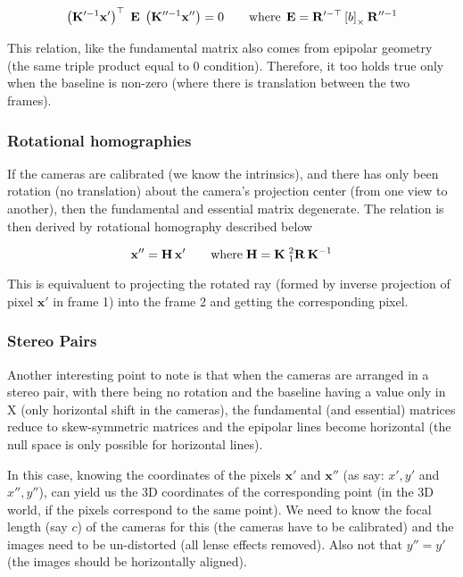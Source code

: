 \begin{equation}
    \left ( \mathbf{K}'^{-1} \mathbf{x}' \right )^\top \; \mathbf{E} \; \left ( \mathbf{K}''^{-1} \mathbf{x}'' \right ) = 0
    \qquad \textup{where} \;\, \mathbf{E} = \mathbf{R}'^{-\top} \left [ b \right ]_\times \mathbf{R}''^{-1}
\end{equation}

This relation, like the fundamental matrix also comes from epipolar geometry (the same triple product equal to 0 condition). Therefore, it too holds true only when the baseline is non-zero (where there is translation between the two frames).

\subsubsection*{Rotational homographies}

If the cameras are calibrated (we know the intrinsics), and there has only been rotation (no translation) about the camera's projection center (from one view to another), then the fundamental and essential matrix degenerate. The relation is then derived by rotational homography described below

\begin{equation}
    \mathbf{x}'' = \mathbf{H} \, \mathbf{x}'
    \qquad \textup{where} \; \mathbf{H} = \mathbf{K} \; ^2_1\mathbf{R} \, \mathbf{K}^{-1}
\end{equation}

This is equivaluent to projecting the rotated ray (formed by inverse projection of pixel $\mathbf{x}'$ in frame 1) into the frame 2 and getting the corresponding pixel.

\subsubsection*{Stereo Pairs}

Another interesting point to note is that when the cameras are arranged in a stereo pair, with there being no rotation and the baseline having a value only in X (only horizontal shift in the cameras), the fundamental (and essential) matrices reduce to skew-symmetric matrices and the epipolar lines become horizontal (the null space is only possible for horizontal lines).

In this case, knowing the coordinates of the pixels $\mathbf{x}'$ and $\mathbf{x}''$ (as say: $x', y'$ and $x'', y''$), can yield us the 3D coordinates of the corresponding point (in the 3D world, if the pixels correspond to the same point). We need to know the focal length (say $c$) of the cameras for this (the cameras have to be calibrated) and the images need to be un-distorted (all lense effects removed). Also not that $y'' = y'$ (the images should be horizontally aligned).

